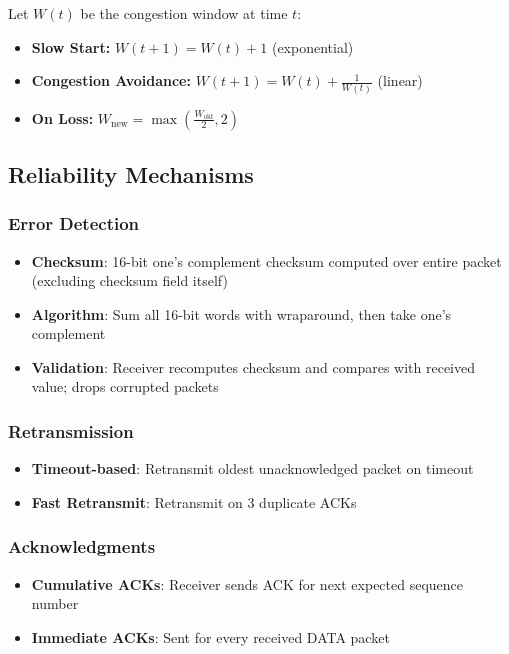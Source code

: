 \documentclass[11pt,a4paper]{article}
\begin{document}
Let $W(t)$ be the congestion window at time $t$:

\begin{itemize}
    \item \textbf{Slow Start:} $W(t+1) = W(t) + 1$ (exponential)
    \item \textbf{Congestion Avoidance:} $W(t+1) = W(t) + \frac{1}{W(t)}$ (linear)
    \item \textbf{On Loss:} $W_{\text{new}} = \max\left(\frac{W_{\text{old}}}{2}, 2\right)$
\end{itemize}

\subsection{Reliability Mechanisms}

\subsubsection{Error Detection}
\begin{itemize}
    \item \textbf{Checksum}: 16-bit one's complement checksum computed over entire packet (excluding checksum field itself)
    \item \textbf{Algorithm}: Sum all 16-bit words with wraparound, then take one's complement
    \item \textbf{Validation}: Receiver recomputes checksum and compares with received value; drops corrupted packets
\end{itemize}

\subsubsection{Retransmission}
\begin{itemize}
    \item \textbf{Timeout-based}: Retransmit oldest unacknowledged packet on timeout
    \item \textbf{Fast Retransmit}: Retransmit on 3 duplicate ACKs
\end{itemize}

\subsubsection{Acknowledgments}
\begin{itemize}
    \item \textbf{Cumulative ACKs}: Receiver sends ACK for next expected sequence number
    \item \textbf{Immediate ACKs}: Sent for every received DATA packet
\end{itemize}
\end{document}
